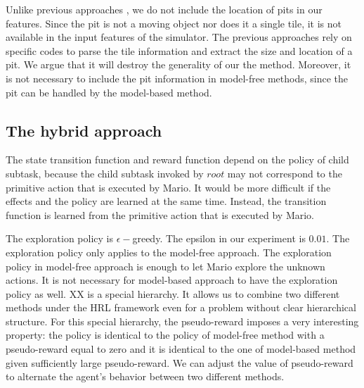 Unlike previous approaches \cite{Paul09, Gibson09, Mohan09, Mohan10},
we do not include the location of pits in our features.
Since the pit is not a moving object nor does it a single tile,
it is not available in the input features of the simulator.
The previous approaches rely on specific codes to parse the tile information
and extract the size and location of a pit. 
We argue that it will destroy the generality of our the method.
Moreover, it is not necessary to include the pit information in model-free methods,
since the pit can be handled by the model-based method. 

\subsection{The hybrid approach}
The state transition function and reward function depend on the policy of 
child subtask, because the child subtask invoked by $root$ may not correspond to the primitive action that is executed by Mario.
It would be more difficult if the effects and the policy are learned at the same time. 
Instead, the transition function is learned from the primitive action that is executed by Mario.

The exploration policy is $\epsilon-$greedy. The epsilon in our experiment is $0.01$.
The exploration policy only applies to the model-free approach. 
The exploration policy in model-free approach is enough to let Mario explore the 
unknown actions. It is not necessary for model-based approach to have the exploration policy as well. 
XX is a special hierarchy. It allows us to combine two different methods under the HRL
framework even for a problem without clear hierarchical structure. 
For this special hierarchy, the pseudo-reward imposes a very interesting property:
the policy is identical to the policy of model-free method with a pseudo-reward equal to zero and
it is identical to the one of model-based method given sufficiently large pseudo-reward.
We can adjust the value of pseudo-reward to alternate the agent's behavior between
two different methods.

